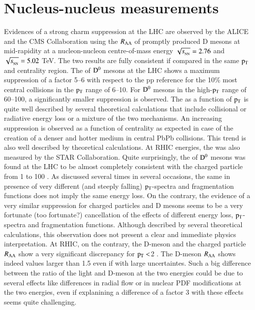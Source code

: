 \documentclass{webofc}
\begin{document}
\section{Nucleus-nucleus measurements}
\label{AAmeasurements}
Evidences of a strong charm suppression at the LHC are observed by the ALICE and the CMS Collaboration using the $R_{\mathrm{AA}}$
of promptly produced D mesons at mid-rapidity at a nucleon-nucleon centre-of-mass energy $\sqrtsNN=2.76$ and $\sqrtsNN=5.02$ TeV. 
The two results are fully consistent if compared in the same $\rm p_{\rm T} $ and centrality region. The \raa of $\rm D^{0}$ mesons at the LHC shows a maximum suppression of 
a factor 5--6 with respect to the pp reference for the 10\% most central collisions in the $\rm p_{\rm T} $ range of 6--10\GeVc. For $\rm D^{0}$ mesons in the high-$\rm p_{\rm T} $ range of 60--100\GeVc, a significantly smaller suppression is observed. 
The \raa as a function of $\rm p_{\rm T} $ is quite well described by several theoretical calculations that include collisional or radiative energy loss or a mixture of the two mechanisms. 
An increasing suppression is observed as a function of centrality as expected in case of the creation of a denser and hotter medium in central PbPb collisions. This trend is also 
well described by theoretical calculations. At RHIC energies, the \raa was also measured by the STAR Collaboration. Quite surprisingly, the \raa of $\rm D^{0}$ mesons was found at the LHC to be almost 
completely consistent with the charged particle \raa from 1 to 100 \GeVc. As discussed several times in several occasions, the same \raa in presence of very different (and steeply falling) $\rm p_{\rm T} $-spectra and fragmentation 
functions does not imply the same energy loss. On the contrary, the evidence of a very similar suppression for charged particles and D mesons seems to be a very fortunate (too fortunate?) cancellation of the effects
of different energy loss, $\rm p_{\rm T} $-spectra and fragmentation functions. Although described by several theoretical calculations, this observation does not present a clear and immediate physics interpretation\footnotemark[\value{footnote}].
At RHIC, on the contrary, the D-meson and the charged particle $R_{\mathrm{AA}}$ show a very significant discrepancy for $\rm p_{\rm T} <$2 \GeVc.  The D-meson $R_{\mathrm{AA}}$ shows indeed values larger than 1.5 even if with large uncertaintes. 
Such a big difference between the ratio of the light and D-meson \raa at the two energies could be due to several effects like differences in radial flow or in nuclear PDF modifications at the two energies, 
even if explanining a difference of a factor 3 with these effects seems quite challenging\footnotemark[\value{footnote}]. 
\end{document}
